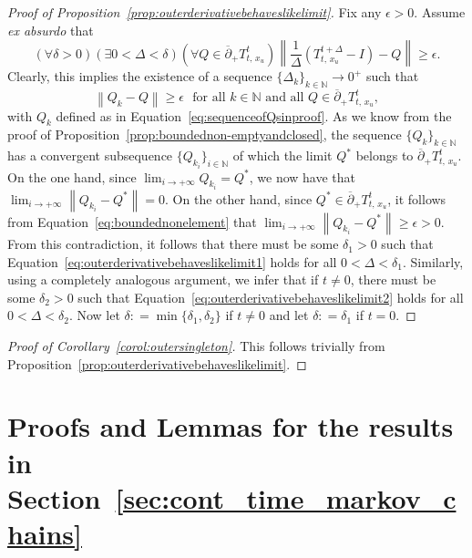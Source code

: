 \documentclass[10pt,a4paper]{paper}
\theoremstyle{definition}
\newcommand{\nats}{\mathbb{N}}
\newcommand{\norm}[1]{\left\lVert #1 \right\rVert}
\newcommand{\coloneqq}{:\!=}
\begin{document}
\begin{proof}[Proof of Proposition~\ref{prop:outerderivativebehaveslikelimit}]
Fix any $\epsilon>0$.
Assume \emph{ex absurdo} that
\begin{equation*}
(\forall\delta>0)(\exists0<\Delta<\delta)
(\forall Q\in\overline{\partial}_{+}
{T^t_{t,\,x_u}})
\norm{\frac{1}{\Delta}
(T^{t+\Delta}_{t,\,x_u}-I)-Q}\geq\epsilon.
\end{equation*}
Clearly, this implies the existence of a sequence $\{\Delta_k\}_{k\in\nats}\to0^+$ such that
\begin{equation}\label{eq:boundednonelement}
\norm{Q_k-Q}\geq\epsilon
\text{~~for all $k\in\nats$ and all $Q\in\overline{\partial}_{+}
{T^t_{t,\,x_u}}$},
\end{equation}
with $Q_k$ defined as in Equation~\eqref{eq:sequenceofQsinproof}. As we know from the proof of Proposition~\ref{prop:boundednon-emptyandclosed}, the sequence $\{Q_k\}_{k\in\nats}$ has a convergent subsequence $\{Q_{k_i}\}_{i\in\nats}$ of which the limit $Q^*$ belongs to $\overline{\partial}_{+}
{T^t_{t,\,x_u}}$. On the one hand, since $\lim_{i\to+\infty}Q_{k_i}=Q^*$, we now have that $\lim_{i\to+\infty}\norm{Q_{k_i}-Q^*}=0$. On the other hand, since $Q^*\in\overline{\partial}_{+}
{T^t_{t,\,x_u}}$, it follows from Equation~\eqref{eq:boundednonelement} that $\lim_{i\to+\infty}\norm{Q_{k_i}-Q^*}\geq\epsilon>0$. From this contradiction, it follows that there must be some $\delta_1>0$ such that Equation~\eqref{eq:outerderivativebehaveslikelimit1} holds for all $0<\Delta<\delta_1$. Similarly, using a completely analogous argument, we infer that if $t\neq0$, there must be some $\delta_2>0$ such that Equation~\eqref{eq:outerderivativebehaveslikelimit2} holds for all $0<\Delta<\delta_2$. Now let $\delta\coloneqq\min\{\delta_1,\delta_2\}$ if $t\neq0$ and let $\delta\coloneqq\delta_1$ if $t=0$.
\end{proof}

\begin{proof}[Proof of Corollary~\ref{corol:outersingleton}]
This follows trivially from Proposition~\ref{prop:outerderivativebehaveslikelimit}.
\end{proof}

\section{Proofs and Lemmas for the results in Section~\ref{sec:cont_time_markov_chains}}
\end{document}
